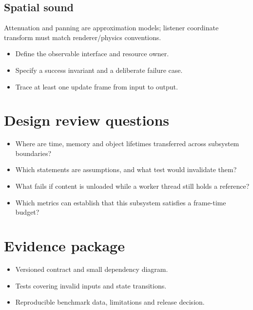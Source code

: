 \documentclass[11pt,letterpaper]{article}
\begin{document}
\subsection{Spatial sound}
Attenuation and panning are approximation models; listener coordinate transform must match renderer/physics conventions.

\begin{itemize}
\item Define the observable interface and resource owner.
\item Specify a success invariant and a deliberate failure case.
\item Trace at least one update frame from input to output.
\end{itemize}
\section{Design review questions}
\begin{itemize}
\item Where are time, memory and object lifetimes transferred across subsystem boundaries?
\item Which statements are assumptions, and what test would invalidate them?
\item What fails if content is unloaded while a worker thread still holds a reference?
\item Which metrics can establish that this subsystem satisfies a frame-time budget?
\end{itemize}
\section{Evidence package}
\begin{itemize}
\item Versioned contract and small dependency diagram.
\item Tests covering invalid inputs and state transitions.
\item Reproducible benchmark data, limitations and release decision.
\end{itemize}
\end{document}
